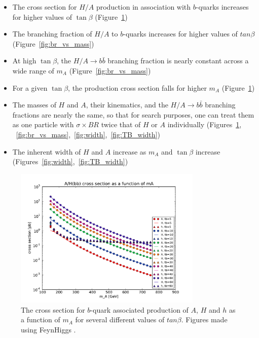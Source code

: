 \begin{itemize}
	\item The cross section for $H/A$ production in association 
        with $b$-quarks increases for higher values of $\tan\beta$ (Figure~\ref{fig:xsec_vs_mass})
	\item The branching fraction of $H/A$ to $b$-quarks increases for higher values of $tan\beta$ (Figure~\ref{fig:br_vs_mass})
	\item At high $\tan\beta$, the $H/A\rightarrow b\bar{b}$ branching 
        fraction is nearly constant across a wide range of $m_A$ (Figure~\ref{fig:br_vs_mass})
	\item For a given $\tan\beta$, the production cross section falls for higher $m_A$ (Figure~\ref{fig:xsec_vs_mass})
	\item The masses of $H$ and $A$, their kinematics, 
        and the $H/A\rightarrow b\bar{b}$ 
        branching fractions are nearly the same, so that for search purposes, one 
        can treat them as one particle with $\sigma \times BR$ twice 
        that of $H$ or $A$ individually (Figures~\ref{fig:xsec_vs_mass},
        ~\ref{fig:br_vs_mass},~\ref{fig:width},~\ref{fig:TB_width})
	\item The inherent width of $H$ and $A$ increase as $m_A$ and $\tan\beta$ increase (Figures~\ref{fig:width},~\ref{fig:TB_width})
\end{itemize}





\begin{figure}
	\centering
	\includegraphics[width=0.8\textwidth]{Theory/figures/mssm_xsec/AH_xsec_vs_mass.pdf}
	\caption{The cross section for $b$-quark associated production of 
    $A$, $H$ and $h$ as a function of $m_A$ for several different values of $tan\beta$. 
    Figures made using FeynHiggs \cite{feynhiggs_1} \cite{feynhiggs_2} \cite{feynhiggs_3}
    \cite{feynhiggs_4} \cite{feynhiggs_5}.
    \label{fig:xsec_vs_mass} }
\end{figure}




